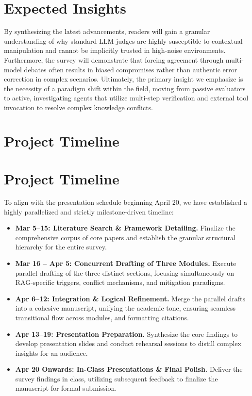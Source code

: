 \documentclass[11pt]{article}
\begin{document}
\section{Expected Insights}
By synthesizing the latest advancements, readers will gain a granular understanding of why standard LLM judges are highly susceptible to contextual manipulation and cannot be implicitly trusted in high-noise environments. Furthermore, the survey will demonstrate that forcing agreement through multi-model debates often results in biased compromises rather than authentic error correction in complex scenarios. Ultimately, the primary insight we emphasize is the necessity of a paradigm shift within the field, moving from passive evaluators to active, investigating agents that utilize multi-step verification and external tool invocation to resolve complex knowledge conflicts.

\section{Project Timeline}
\section{Project Timeline}
To align with the presentation schedule beginning April 20, we have established a highly parallelized and strictly milestone-driven timeline:
\begin{itemize}
    \item{\textbf{Mar 5–15: Literature Search \& Framework Detailing.}} Finalize the comprehensive corpus of core papers and establish the granular structural hierarchy for the entire survey. 
    \item{\textbf{Mar 16 – Apr 5: Concurrent Drafting of Three Modules.}} Execute parallel drafting of the three distinct sections, focusing simultaneously on RAG-specific triggers, conflict mechanisms, and mitigation paradigms. 
    \item{\textbf{Apr 6–12: Integration \& Logical Refinement.}} Merge the parallel drafts into a cohesive manuscript, unifying the academic tone, ensuring seamless transitional flow across modules, and formatting citations. 
    \item{\textbf{Apr 13–19: Presentation Preparation.}} Synthesize the core findings to develop presentation slides and conduct rehearsal sessions to distill complex insights for an audience.
    \item{\textbf{Apr 20 Onwards: In-Class Presentations \& Final Polish.}} Deliver the survey findings in class, utilizing subsequent feedback to finalize the manuscript for formal submission.
\end{itemize}



\end{document}
